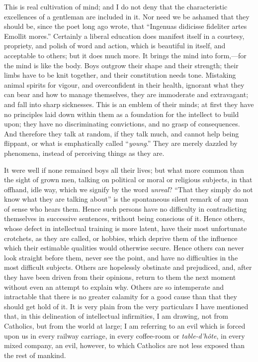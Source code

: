 This is real cultivation of mind; and I do not deny that the
characteristic excellences of a gentleman are included in it. Nor need
we be ashamed that they should be, since the poet long ago wrote, that
``Ingenuas didicisse fideliter artes Emollit mores.'' Certainly
a liberal education does manifest itself in a courtesy, propriety, and
polish of word and action, which is beautiful in itself, and acceptable
to others; but it does much more. It brings the mind into form,—for
the mind is like the body. Boys outgrow their shape and their strength;
their limbs have to be knit together, and their constitution needs tone.
Mistaking animal spirits for vigour, and overconfident in their health,
ignorant what they can bear and how to manage themselves, they are
immoderate and extravagant; and fall into sharp sicknesses. This is an
emblem of their minds; at first they have no principles laid down within
them as a foundation for the intellect to build upon; they have no
discriminating convictions, and no grasp of consequences. And therefore
they talk at random, if they talk much, and cannot help being
flippant, or what is emphatically called ``\emph{young}.'' They
are merely dazzled by phenomena, instead of perceiving things as they
are.

It were well if none remained boys all their lives; but what more
common than the sight of grown men, talking on political or moral or
religious subjects, in that offhand, idle way, which we signify by the
word \emph{unreal}? ``That they simply do not know what they are
talking about'' is the spontaneous silent remark of any man of sense
who hears them. Hence such persons have no difficulty in contradicting
themselves in successive sentences, without being conscious of it. Hence
others, whose defect in intellectual training is more latent, have their
most unfortunate crotchets, as they are called, or hobbies, which
deprive them of the influence which their estimable qualities would
otherwise secure. Hence others can never look straight before them,
never see the point, and have no difficulties in the most difficult
subjects. Others are hopelessly obstinate and prejudiced, and, after
they have been driven from their opinions, return to them the next
moment without even an attempt to explain why. Others are so intemperate
and intractable that there is no greater calamity for a good cause than
that they should get hold of it. It is very plain from the very
particulars I have mentioned that, in this delineation of intellectual
infirmities, I am drawing, not from Catholics, but from the world at
large; I am referring to an evil which is forced upon us in every
railway carriage, in every coffee-room or \emph{table-d'hôte}, in every
mixed company, an evil, however, to which Catholics are not less exposed
than the rest of mankind.


